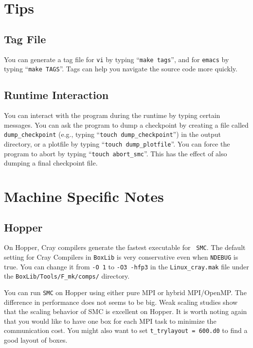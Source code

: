 \documentclass[11pt,letterpaper]{article}
\begin{document}
\section{Tips}

\subsection{Tag File}

You can generate a tag file for {\tt vi} by typing ``{\tt make
  tags}'', and for {\tt emacs} by typing ``{\tt make TAGS}''.  Tags
can help you navigate the source code more quickly.

\subsection{Runtime Interaction}

You can interact with the program during the runtime by typing certain
messages.  You can ask the program to dump a checkpoint by creating a
file called {\tt dump\_checkpoint} (e.g., typing ``{\tt touch
  dump\_checkpoint}'') in the output directory, or a plotfile by
typing ``{\tt touch dump\_plotfile}''.  You can force the program to
abort by typing ``{\tt touch abort\_smc}''.  This has the effect of
also dumping a final checkpoint file.

\section{Machine Specific Notes}

\subsection{Hopper}

On Hopper, Cray compilers generate the fastest executable for {\tt
  SMC}.  The default setting for Cray Compilers in {\tt BoxLib} is
very conservative even when {\tt NDEBUG} is true.  You can change it
from {\tt -O 1} to {\tt -O3 -hfp3} in the {\tt Linux\_cray.mak} file
under the {\tt BoxLib/Tools/F\_mk/comps/} directory.

You can run {\tt SMC} on Hopper using either pure MPI or hybrid
MPI/OpenMP.  The difference in performance does not seems to be big.
Weak scaling studies show that the scaling behavior of SMC is
excellent on Hopper.  It is worth noting again that you would like to
have one box for each MPI task to minimize the communication cost.
You might also want to set {\tt t\_trylayout = 600.d0} to find a good
layout of boxes.
\end{document}
